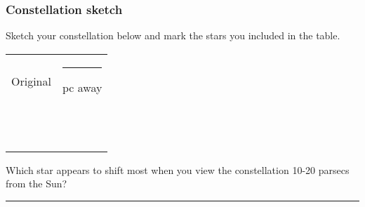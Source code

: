 \documentclass[main.tex]{subfiles}
\begin{document}
\subsubsection{Constellation sketch}
Sketch your constellation below and mark the stars you included in the table.

\begin{table}[h!]
\begin{center}
\begin{tabular}{|p{}|p{}|}\hline
Original & \rule{1cm}{.15mm} pc away \\
&\\
&\\
&\\
&\\
&\\
&\\
&\\
&\\
&\\
&\\\hline
\end{tabular}
\end{center}
\label{tab:tab_constell}
\end{table}
Which star appears to shift most when you view the constellation 10-20 parsecs from the Sun?

\rule{15cm}{.15mm}
\end{document}
